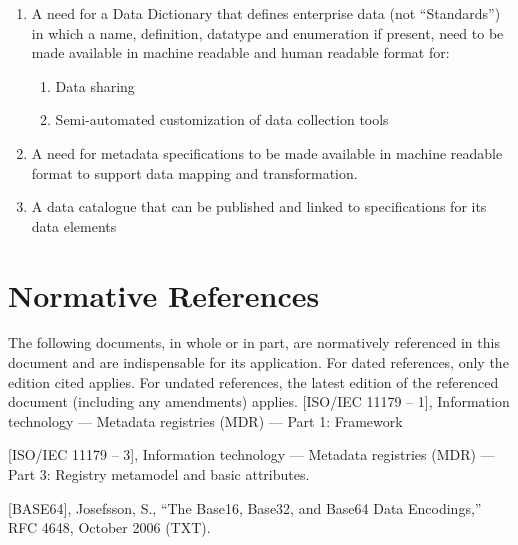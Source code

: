 \documentclass{article}
\begin{document}
	\begin{enumerate}
		\item A need for a Data Dictionary that defines enterprise data (not “Standards”) in which a name,
definition, datatype and enumeration if present, need to be made available in machine readable
and human readable format for:
	\begin{enumerate}
		\item Data sharing
		\item Semi-automated customization of data collection tools
	\end{enumerate}
		\item A need for metadata specifications to be made available in machine readable format to support data mapping and transformation.
		\item A data catalogue that can be published and linked to specifications for its data elements	
	\end{enumerate}


	
\section{Normative References}

The following documents, in whole or in part, are normatively referenced in this document and are indispensable for its application. For dated references, only the edition cited applies. For undated references, the latest edition of the referenced document (including any amendments) applies.
[ISO/IEC 11179 – 1], Information technology — Metadata registries (MDR) — Part 1: Framework

[ISO/IEC 11179 – 3], Information technology — Metadata registries (MDR) — Part 3: Registry metamodel and basic attributes.

[BASE64],	Josefsson, S., “The Base16, Base32, and Base64 Data Encodings,” RFC 4648, October 2006 (TXT).
\end{document}
